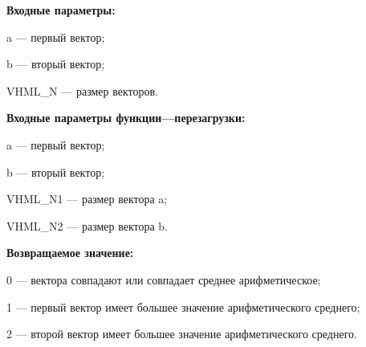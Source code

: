 \textbf{Входные параметры:}

a --- первый вектор;
 
b --- вторый вектор;
 
VHML\_N --- размер векторов.
 
\textbf{Входные параметры функции---перезагрузки:}
 
a --- первый вектор;
 
b --- вторый вектор;
 
VHML\_N1 --- размер вектора a;
 
VHML\_N2 --- размер вектора b.

\textbf{Возвращаемое значение:}

0 --- вектора совпадают или совпадает среднее арифметическое;
 
1 --- первый вектор имеет большее значение арифметического среднего;
 
2 --- второй вектор имеет большее значение арифметического среднего.